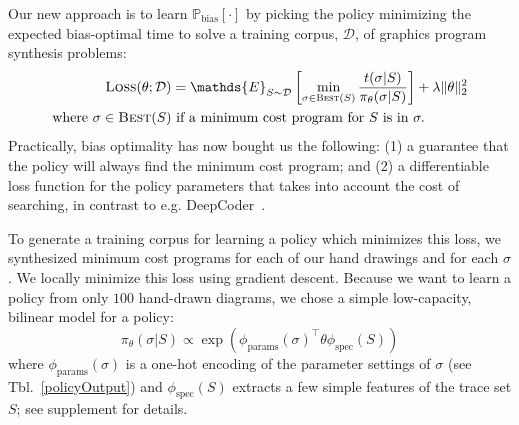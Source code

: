 \documentclass{article}
\newcommand{\expect}{\mathds{E}} %
\newcommand{\probability}{\mathds{P}} %
\theoremstyle{definition}
\begin{document}
Our new approach is to learn $\probability_{\text{bias}}[\cdot ]$
by picking the policy minimizing the
expected bias-optimal time to solve a training corpus, $\mathcal{D}$, of graphics program synthesis problems:
\begin{align}
\textsc{Loss}(\theta ; \mathcal{D})& =  \expect_{S\sim\mathcal{D}}\left[ \min_{\sigma\in \text{\textsc{Best}}(S)}\frac{t(\sigma | S)}{\pi_\theta (\sigma | S)}\right] + \lambda \Vert\theta\Vert_2^2\label{policyLoss}\\
\text{where }  \sigma \in\text{\textsc{Best}}(S) &\text{ if  a minimum cost program for }S \text{ is in }\sigma .\nonumber %
\end{align}
Practically, bias optimality has now bought us the following: (1) a guarantee that the policy will always find the minimum cost program; and (2) a differentiable loss function for the policy parameters that takes into account the cost of searching, in contrast to e.g. DeepCoder~\citep{BalGauBroetal16}.

To generate a training corpus for learning a policy which minimizes this loss,
we synthesized minimum cost programs for each of our hand drawings
and for each $\sigma $.
We locally minimize this loss using gradient descent. %
Because we want to learn a policy from only $100$ hand-drawn diagrams,
we chose a simple low-capacity, bilinear model for a policy:
\begin{equation}
  \pi_{\theta}(\sigma |S)\propto \exp \left( \phi_{\text{params}}(\sigma )^\top\theta \phi_{\text{spec}}(S)\right)
\end{equation}
where $\phi_{\text{params}}(\sigma  )$ is a one-hot encoding of
the parameter settings of $\sigma $ (see Tbl.~\ref{policyOutput})
and $\phi_{\text{spec}}(S)$ extracts a few simple features of the trace set $S$;
see supplement for details.
\end{document}
